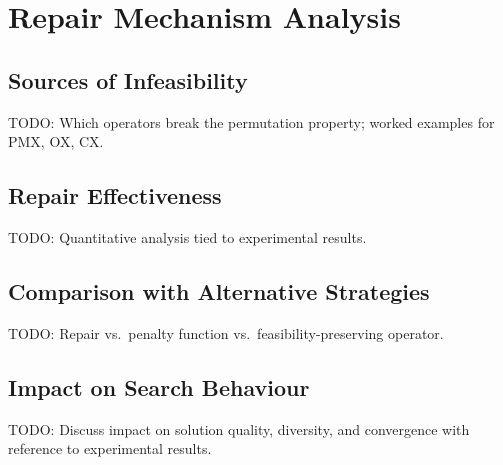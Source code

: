 \chapter{Repair Mechanism Analysis}
\label{Chapter4}

\section{Sources of Infeasibility}
\label{Sec:Infeasibility}
TODO: Which operators break the permutation property; worked examples for PMX, OX, CX.

\section{Repair Effectiveness}
\label{Sec:RepairEffectiveness}
TODO: Quantitative analysis tied to experimental results.

\section{Comparison with Alternative Strategies}
\label{Sec:RepairComparison}
TODO: Repair vs.\ penalty function vs.\ feasibility-preserving operator.

\section{Impact on Search Behaviour}
\label{Sec:SearchImpact}
TODO: Discuss impact on solution quality, diversity, and convergence with reference to experimental results.
